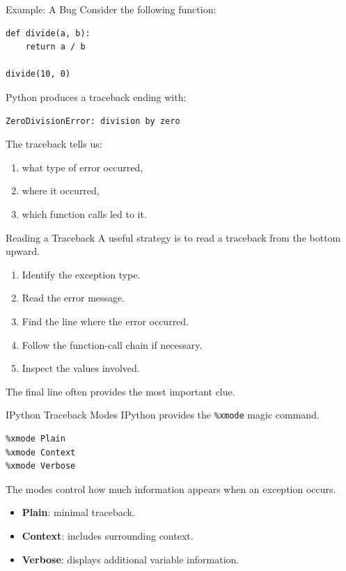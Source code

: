 \documentclass[aspectratio=169]{beamer}
\begin{document}
\begin{frame}[fragile]{Example: A Bug}
Consider the following function:

\begin{lstlisting}
def divide(a, b):
    return a / b

divide(10, 0)
\end{lstlisting}

Python produces a traceback ending with:

\begin{verbatim}
ZeroDivisionError: division by zero
\end{verbatim}

The traceback tells us:
\begin{enumerate}
    \item what type of error occurred,
    \item where it occurred,
    \item which function calls led to it.
\end{enumerate}
\end{frame}

\begin{frame}{Reading a Traceback}
A useful strategy is to read a traceback from the bottom upward.

\begin{enumerate}
    \item Identify the exception type.
    \item Read the error message.
    \item Find the line where the error occurred.
    \item Follow the function-call chain if necessary.
    \item Inspect the values involved.
\end{enumerate}

\vspace{0.3cm}

The final line often provides the most important clue.
\end{frame}

\begin{frame}[fragile]{IPython Traceback Modes}
IPython provides the \texttt{\%xmode} magic command.

\begin{lstlisting}
%xmode Plain
%xmode Context
%xmode Verbose
\end{lstlisting}

The modes control how much information appears when an exception occurs.

\begin{itemize}
    \item \textbf{Plain}: minimal traceback.
    \item \textbf{Context}: includes surrounding context.
    \item \textbf{Verbose}: displays additional variable information.
\end{itemize}
\end{frame}
\end{document}
